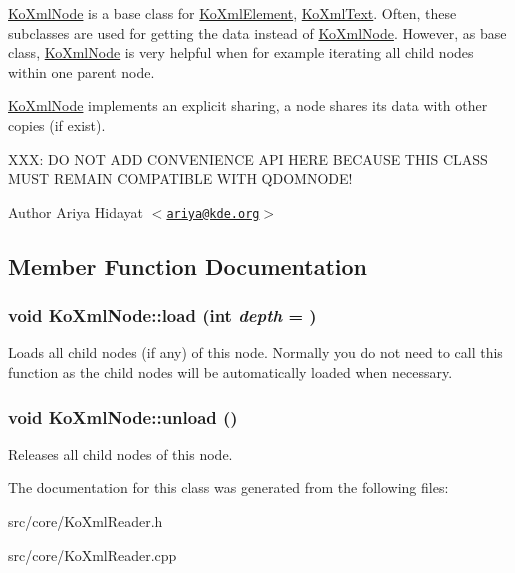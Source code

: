 \hyperlink{classKoXmlNode}{KoXmlNode} is a base class for \hyperlink{classKoXmlElement}{KoXmlElement}, \hyperlink{classKoXmlText}{KoXmlText}. Often, these subclasses are used for getting the data instead of \hyperlink{classKoXmlNode}{KoXmlNode}. However, as base class, \hyperlink{classKoXmlNode}{KoXmlNode} is very helpful when for example iterating all child nodes within one parent node.

\hyperlink{classKoXmlNode}{KoXmlNode} implements an explicit sharing, a node shares its data with other copies (if exist).

XXX: DO NOT ADD CONVENIENCE API HERE BECAUSE THIS CLASS MUST REMAIN COMPATIBLE WITH QDOMNODE!

\begin{DoxyAuthor}{Author}
Ariya Hidayat $<$\href{mailto:ariya@kde.org}{\tt ariya@kde.org}$>$ 
\end{DoxyAuthor}


\subsection{Member Function Documentation}
\hypertarget{classKoXmlNode_a00f067df3c054abdb722f3cdf372f58f}{
\subsubsection[{load}]{\setlength{\rightskip}{0pt plus 5cm}void KoXmlNode::load (int {\em depth} = {})}}
\label{classKoXmlNode_a00f067df3c054abdb722f3cdf372f58f}
Loads all child nodes (if any) of this node. Normally you do not need to call this function as the child nodes will be automatically loaded when necessary. \hypertarget{classKoXmlNode_a6db615544f532dec26530d2fe413c946}{
\subsubsection[{unload}]{\setlength{\rightskip}{0pt plus 5cm}void KoXmlNode::unload ()}}
\label{classKoXmlNode_a6db615544f532dec26530d2fe413c946}
Releases all child nodes of this node. 

The documentation for this class was generated from the following files:\begin{DoxyCompactItemize}
\item 
src/core/KoXmlReader.h\item 
src/core/KoXmlReader.cpp\end{DoxyCompactItemize}
